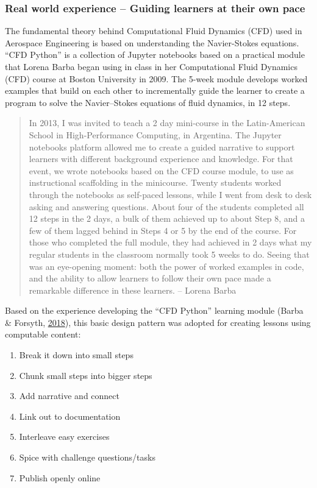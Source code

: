 \documentclass[]{book}
\providecommand{\tightlist}{%
  \setlength{\itemsep}{0pt}\setlength{\parskip}{0pt}}
\begin{document}
\subsubsection{Real world experience -- Guiding learners at their own
pace}\label{real-world-experience-guiding-learners-at-their-own-pace}

The fundamental theory behind Computational Fluid Dynamics (CFD) used in
Aerospace Engineering is based on understanding the Navier-Stokes
equations. ``CFD Python'' is a collection of Jupyter notebooks based on
a practical module that Lorena Barba began using in class in her
Computational Fluid Dynamics (CFD) course at Boston University in 2009.
The 5-week module develops worked examples that build on each other to
incrementally guide the learner to create a program to solve the
Navier--Stokes equations of fluid dynamics, in 12 steps.

\begin{quote}
In 2013, I was invited to teach a 2 day mini-course in the
Latin-American School in High-Performance Computing, in Argentina. The
Jupyter notebooks platform allowed me to create a guided narrative to
support learners with different background experience and knowledge. For
that event, we wrote notebooks based on the CFD course module, to use as
instructional scaffolding in the minicourse. Twenty students worked
through the notebooks as self-paced lessons, while I went from desk to
desk asking and answering questions. About four of the students
completed all 12 steps in the 2 days, a bulk of them achieved up to
about Step 8, and a few of them lagged behind in Steps 4 or 5 by the end
of the course. For those who completed the full module, they had
achieved in 2 days what my regular students in the classroom normally
took 5 weeks to do. Seeing that was an eye-opening moment: both the
power of worked examples in code, and the ability to allow learners to
follow their own pace made a remarkable difference in these learners. --
Lorena Barba
\end{quote}

Based on the experience developing the ``CFD Python'' learning module
(Barba \& Forsyth, \protect\hyperlink{ref-barbacfd}{2018}), this basic
design pattern was adopted for creating lessons using computable
content:

\begin{enumerate}
\def\labelenumi{\arabic{enumi}.}
\tightlist
\item
  Break it down into small steps
\item
  Chunk small steps into bigger steps
\item
  Add narrative and connect
\item
  Link out to documentation
\item
  Interleave easy exercises
\item
  Spice with challenge questions/tasks
\item
  Publish openly online
\end{enumerate}
\end{document}
